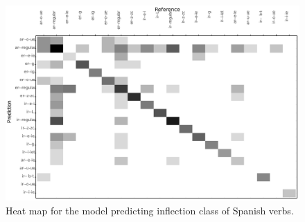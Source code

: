 \begin{figure}
  \includegraphics[width=0.85\textheight]{./figures/spanish/p-class-inflection1.pdf}
  \caption{Heat map for the model predicting inflection class of Spanish verbs.}
  \label{fig:spanish-verbs-class-v}
\end{figure}


